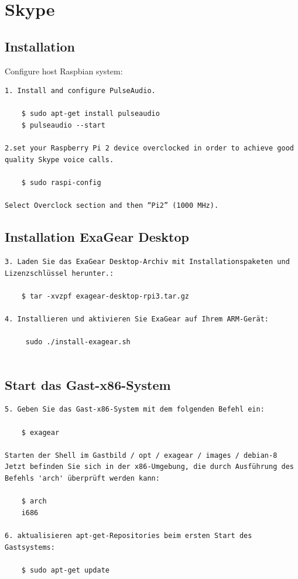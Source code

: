 \section{Skype}

\subsection{Installation}
Configure host Raspbian system:
\begin{verbatim}
1. Install and configure PulseAudio.

	$ sudo apt-get install pulseaudio
	$ pulseaudio --start

2.set your Raspberry Pi 2 device overclocked in order to achieve good quality Skype voice calls. 

	$ sudo raspi-config

Select Overclock section and then “Pi2” (1000 MHz).

\end{verbatim}

\subsection{Installation ExaGear Desktop}
\begin{verbatim}
3. Laden Sie das ExaGear Desktop-Archiv mit Installationspaketen und Lizenzschlüssel herunter.:

	$ tar -xvzpf exagear-desktop-rpi3.tar.gz
	
4. Installieren und aktivieren Sie ExaGear auf Ihrem ARM-Gerät:

	 sudo ./install-exagear.sh
	 
\end{verbatim}
\subsection{Start das Gast-x86-System}
\begin{verbatim}
5. Geben Sie das Gast-x86-System mit dem folgenden Befehl ein:

	$ exagear
	
Starten der Shell im Gastbild / opt / exagear / images / debian-8
Jetzt befinden Sie sich in der x86-Umgebung, die durch Ausführung des Befehls 'arch' überprüft werden kann:

	$ arch
	i686
	
6. aktualisieren apt-get-Repositories beim ersten Start des Gastsystems:

	$ sudo apt-get update
	
\end{verbatim}
